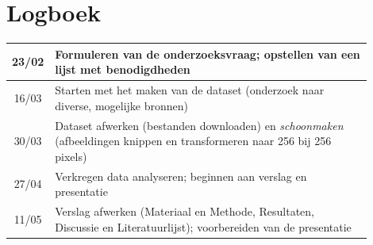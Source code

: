 \documentclass[dutch, twoside, a4paper, 10pt]{article}
\begin{document}
\section{Logboek}
\renewcommand{\arraystretch}{1.5}
\begin{table}[h!]
\centering
\begin{tabular}{|c|p{0.9\linewidth}|}
    \hline
    23/02 & Formuleren van de onderzoeksvraag; opstellen van een lijst met benodigdheden \\
    \hline
     16/03 & Starten met het maken van de dataset (onderzoek naar diverse, mogelijke bronnen)  \\
     \hline
     30/03 & Dataset afwerken (bestanden downloaden) en \textit{schoonmaken} (afbeeldingen knippen en transformeren naar 256 bij 256 pixels) \\
     \hline
     27/04 & Verkregen data analyseren; beginnen aan verslag en presentatie\\
     \hline
     11/05 & Verslag afwerken (Materiaal en Methode, Resultaten, Discussie en Literatuurlijst); voorbereiden van de presentatie\\
     \hline
\end{tabular}
\end{table}
\end{document}
